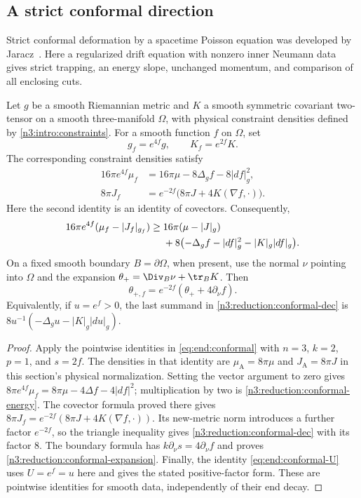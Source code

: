 \subsection{A strict conformal direction}

Strict conformal deformation by a spacetime Poisson equation was developed
by Jaracz~\cite{Jaracz2025StrictDEC}. Here a regularized drift equation
with nonzero inner Neumann data gives strict trapping, an energy slope,
unchanged momentum, and comparison of all enclosing cuts.

\begin{lemma}
\label{n3:reduction:conformal-formulas}
Let $g$ be a smooth Riemannian metric and $K$ a smooth symmetric
covariant two-tensor on a smooth three-manifold $\Omega$, with physical
constraint densities defined by \eqref{n3:intro:constraints}.
For a smooth function $f$ on $\Omega$, set
\[
 g_f=e^{4f}g,\qquad K_f=e^{2f}K.
\]
The corresponding constraint densities satisfy
\begin{align}
 16\pi e^{4f}\mu_f
   &=16\pi\mu-8\Delta_g f-8|df|_g^2,
       \label{n3:reduction:conformal-energy}\\
 8\pi J_f
   &=e^{-2f}\bigl(8\pi J+4K(\nabla f,\cdot)\bigr).
       \label{n3:reduction:conformal-momentum}
\end{align}
Here the second identity is an identity of covectors.  Consequently,
\begin{align}
 16\pi e^{4f}(\mu_f-|J_f|_{g_f})
 \ge{}&16\pi(\mu-|J|_g)\notag\\
 &+8\bigl(-\Delta_g f-|df|_g^2-|K|_g|df|_g\bigr).
       \label{n3:reduction:conformal-dec}
\end{align}
On a fixed smooth boundary $B=\partial\Omega$, when present, use the
normal $\nu$ pointing into $\Omega$ and the expansion
$\theta_+=\Div_B\nu+\tr_BK$. Then
\begin{equation}
 \theta_{+,f}=e^{-2f}(\theta_++4\partial_\nu f).
       \label{n3:reduction:conformal-expansion}
\end{equation}
Equivalently, if $u=e^f>0$, the last summand in
\eqref{n3:reduction:conformal-dec} is
$8u^{-1}(-\Delta_g u-|K|_g|du|_g)$.
\end{lemma}

\begin{proof}
Apply the pointwise identities in \eqref{eq:end:conformal}
with $n=3$, $k=2$, $p=1$, and $s=2f$. The densities in that identity
are $\mu_{\mathrm A}=8\pi\mu$ and $J_{\mathrm A}=8\pi J$ in this
section's physical normalization. Setting the vector argument to zero
gives $8\pi e^{4f}\mu_f=8\pi\mu-4\Delta f-4|df|^2$;
multiplication by two is
\eqref{n3:reduction:conformal-energy}. The covector formula
proved there gives
$8\pi J_f=e^{-2f}(8\pi J+4K(\nabla f,\cdot))$.
Its new-metric norm introduces a further factor $e^{-2f}$, so the
triangle inequality gives \eqref{n3:reduction:conformal-dec}
with its factor $8$. The boundary formula has
$k\partial_\nu s=4\partial_\nu f$ and proves
\eqref{n3:reduction:conformal-expansion}. Finally, the identity
\eqref{eq:end:conformal-U} uses $U=e^f=u$ here and gives
the stated positive-factor form. These are pointwise identities for smooth data, independently of their end decay.
\end{proof}

